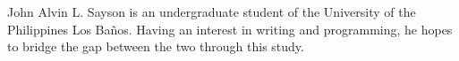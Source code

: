 \documentclass[journal]{./IEEE/IEEEtran}
\begin{document}












\nocite{*}

\begin{biography}
{John Alvin L. Sayson} is an undergraduate student of the University of the Philippines Los Ba\~{n}os. Having an interest in writing and programming, he hopes to bridge the gap between the two through this study.
\end{biography}
\end{document}
